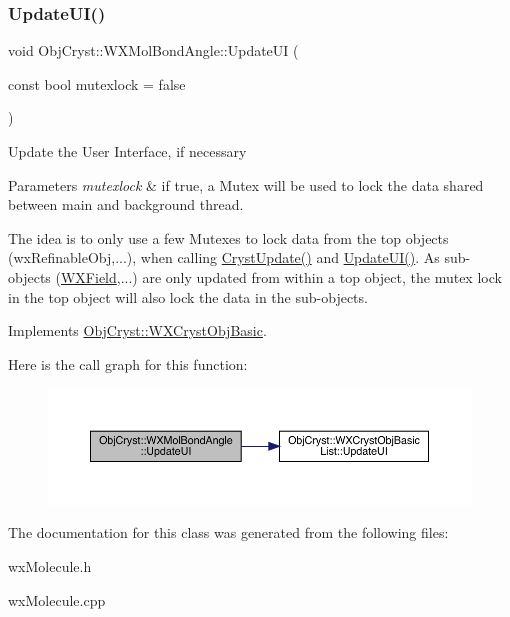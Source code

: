 \subsubsection{\texorpdfstring{UpdateUI()}{UpdateUI()}}
{\footnotesize\ttfamily void Obj\+Cryst\+::\+W\+X\+Mol\+Bond\+Angle\+::\+Update\+UI (\begin{DoxyParamCaption}\item[{const bool}]{mutexlock = {\ttfamily false} }\end{DoxyParamCaption})\hspace{0.3cm}{\ttfamily [virtual]}}

Update the User Interface, if necessary


\begin{DoxyParams}{Parameters}
{\em mutexlock} & if true, a Mutex will be used to lock the data shared between main and background thread.\\
\hline
\end{DoxyParams}
The idea is to only use a few Mutexes to lock data from the top objects (wx\+Refinable\+Obj,...), when calling \mbox{\hyperlink{class_obj_cryst_1_1_w_x_mol_bond_angle_a5b2a6926b4fa8ec901eeaac25c954cc8}{Cryst\+Update()}} and \mbox{\hyperlink{class_obj_cryst_1_1_w_x_mol_bond_angle_ad9b0fd4485aaff2af3f32ddb1dd2b0f0}{Update\+U\+I()}}. As sub-\/objects (\mbox{\hyperlink{class_obj_cryst_1_1_w_x_field}{W\+X\+Field}},...) are only updated from within a top object, the mutex lock in the top object will also lock the data in the sub-\/objects. 

Implements \mbox{\hyperlink{class_obj_cryst_1_1_w_x_cryst_obj_basic_a3818940b7031ff7e45cf2178c4a99c90}{Obj\+Cryst\+::\+W\+X\+Cryst\+Obj\+Basic}}.

Here is the call graph for this function\+:
\nopagebreak
\begin{figure}[H]
\begin{center}
\leavevmode
\includegraphics[width=350pt]{class_obj_cryst_1_1_w_x_mol_bond_angle_ad9b0fd4485aaff2af3f32ddb1dd2b0f0_cgraph}
\end{center}
\end{figure}


The documentation for this class was generated from the following files\+:\begin{DoxyCompactItemize}
\item 
wx\+Molecule.\+h\item 
wx\+Molecule.\+cpp\end{DoxyCompactItemize}
